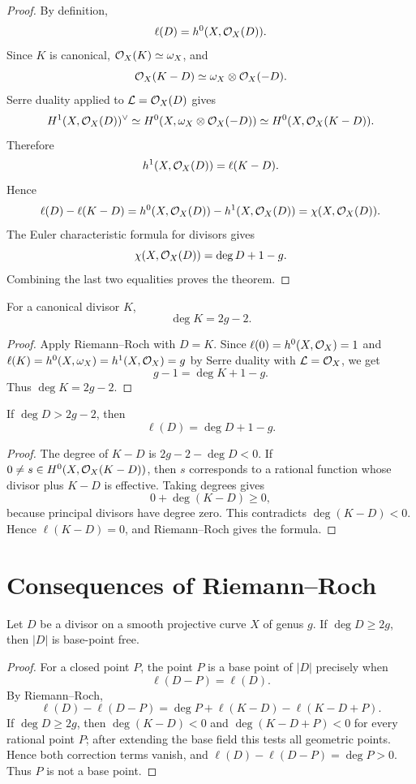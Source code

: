 \begin{proof}
By definition,
\[
    \ell(D)=h^0(X,\mathcal{O}_X(D)).
\]
Since \(K\) is canonical, \(\mathcal{O}_X(K)\simeq\omega_X\), and
\[
    \mathcal{O}_X(K-D)\simeq \omega_X\otimes\mathcal{O}_X(-D).
\]
Serre duality applied to \(\mathcal{L}=\mathcal{O}_X(D)\) gives
\[
    H^1(X,\mathcal{O}_X(D))^\vee
    \simeq
    H^0(X,\omega_X\otimes\mathcal{O}_X(-D))
    \simeq
    H^0(X,\mathcal{O}_X(K-D)).
\]
Therefore
\[
    h^1(X,\mathcal{O}_X(D))=\ell(K-D).
\]
Hence
\[
    \ell(D)-\ell(K-D)
    =
    h^0(X,\mathcal{O}_X(D))-h^1(X,\mathcal{O}_X(D))
    =
    \chi(X,\mathcal{O}_X(D)).
\]
The Euler characteristic formula for divisors gives
\[
    \chi(X,\mathcal{O}_X(D))=\deg D+1-g.
\]
Combining the last two equalities proves the theorem.
\end{proof}

\begin{corollary}
For a canonical divisor \(K\),
\[
    \deg K=2g-2.
\]
\end{corollary}

\begin{proof}
Apply Riemann--Roch with \(D=K\).  Since \(\ell(0)=h^0(X,\mathcal{O}_X)=1\) and
\(\ell(K)=h^0(X,\omega_X)=h^1(X,\mathcal{O}_X)=g\) by Serre duality with
\(\mathcal{L}=\mathcal{O}_X\), we get
\[
    g-1=\deg K+1-g.
\]
Thus \(\deg K=2g-2\).
\end{proof}

\begin{corollary}
If \(\deg D>2g-2\), then
\[
    \ell(D)=\deg D+1-g.
\]
\end{corollary}

\begin{proof}
The degree of \(K-D\) is \(2g-2-\deg D<0\).  If
\(0\ne s\in H^0(X,\mathcal{O}_X(K-D))\), then \(s\) corresponds to a rational function
whose divisor plus \(K-D\) is effective.  Taking degrees gives
\[
    0+\deg(K-D)\ge0,
\]
because principal divisors have degree zero.  This contradicts
\(\deg(K-D)<0\).  Hence \(\ell(K-D)=0\), and Riemann--Roch gives the formula.
\end{proof}

\section{Consequences of Riemann--Roch}

\begin{proposition}
Let \(D\) be a divisor on a smooth projective curve \(X\) of genus \(g\).  If
\(\deg D\ge 2g\), then \(|D|\) is base-point free.
\end{proposition}

\begin{proof}
For a closed point \(P\), the point \(P\) is a base point of \(|D|\) precisely
when
\[
    \ell(D-P)=\ell(D).
\]
By Riemann--Roch,
\[
    \ell(D)-\ell(D-P)
    =
    \deg P+\ell(K-D)-\ell(K-D+P).
\]
If \(\deg D\ge2g\), then \(\deg(K-D)<0\) and
\(\deg(K-D+P)<0\) for every rational point \(P\); after extending the base
field this tests all geometric points.  Hence both correction terms vanish,
and \(\ell(D)-\ell(D-P)=\deg P>0\).  Thus \(P\) is not a base point.
\end{proof}

